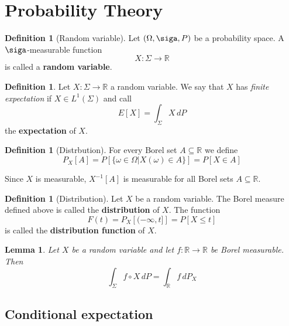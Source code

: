 \documentclass[10pt, oneside, reqno]{amsart}
\theoremstyle{plain}%
\newtheorem{lem}[thm]{Lemma}
\theoremstyle{definition}
\newtheorem{defn}[thm]{Definition}
\theoremstyle{remark}
\newcommand{\R}{\mathbb{R}}
\begin{document}














\section{Probability Theory} %
\label{sec:probability_theory}

\begin{defn}[Random variable]
    Let $(\Omega, \siga, P)$ be a probability space.  A $\siga$-measurable function \[
        X : \Sigma \rightarrow \R
    \] is called a \textbf{random variable}. 
\end{defn}

\begin{defn}
    Let $X : \Sigma \rightarrow \R$ a random variable.  We say that $X$ has \emph{finite expectation} if $X \in L^1(\Sigma)$ and call \[
        E[X] = \int_\Sigma X \, dP
    \] the \textbf{expectation} of $X$.  
\end{defn}

\begin{defn}[Distrbution]
    For every Borel set $A \subseteq \R$ we define \[
        P_X[A] = P[ \{ \omega \in \Omega | X(\omega) \in A\}] = P[X \in A]
    \]
\end{defn}

Since $X$ is measurable, $X^{-1}[A]$ is measurable for all Borel sets $A \subseteq \R$. 

\begin{defn}[Distribution]
    Let $X$ be a random variable. The Borel measure defined above is called the \textbf{distribution} of $X$.  The function \[
        F(t) = P_X\left[(-\infty,t] \right] = P[X \leq t]
    \] is called the \textbf{distribution function} of $X$.
\end{defn}

\begin{lem}
    Let $X$ be a random variable and let $f: \R \rightarrow \R$ be Borel measurable.  Then \[
        \int_\Sigma f \circ X \, dP = \int_\R f \, dP_X
    \]
\end{lem}

\subsection{Conditional expectation} %
\label{sub:conditional_expectation}
\end{document}
